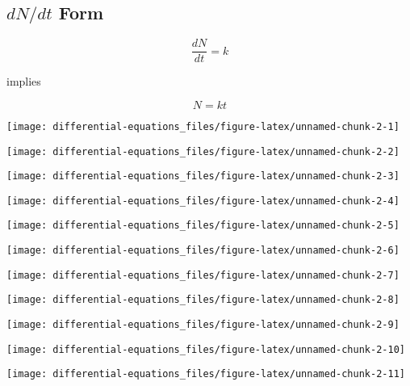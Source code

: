 \documentclass[]{tufte-handout}
\begin{document}
\hypertarget{dndt-form}{%
\subsection{\texorpdfstring{\(dN/dt\)
Form}{dN/dt Form}}\label{dndt-form}}

\[\frac{dN}{dt} = k\]

implies

\[N = kt\]

\begin{marginfigure}
\texttt{[image: differential-equations\_files/figure-latex/unnamed-chunk-2-1]} \end{marginfigure}
\begin{marginfigure}
\texttt{[image: differential-equations\_files/figure-latex/unnamed-chunk-2-2]} \end{marginfigure}
\begin{marginfigure}
\texttt{[image: differential-equations\_files/figure-latex/unnamed-chunk-2-3]} \end{marginfigure}
\begin{marginfigure}
\texttt{[image: differential-equations\_files/figure-latex/unnamed-chunk-2-4]} \end{marginfigure}
\begin{marginfigure}
\texttt{[image: differential-equations\_files/figure-latex/unnamed-chunk-2-5]} \end{marginfigure}
\begin{marginfigure}
\texttt{[image: differential-equations\_files/figure-latex/unnamed-chunk-2-6]} \end{marginfigure}
\begin{marginfigure}
\texttt{[image: differential-equations\_files/figure-latex/unnamed-chunk-2-7]} \end{marginfigure}
\begin{marginfigure}
\texttt{[image: differential-equations\_files/figure-latex/unnamed-chunk-2-8]} \end{marginfigure}
\begin{marginfigure}
\texttt{[image: differential-equations\_files/figure-latex/unnamed-chunk-2-9]} \end{marginfigure}
\begin{marginfigure}
\texttt{[image: differential-equations\_files/figure-latex/unnamed-chunk-2-10]} \end{marginfigure}
\begin{marginfigure}
\texttt{[image: differential-equations\_files/figure-latex/unnamed-chunk-2-11]} \end{marginfigure}
\end{document}

